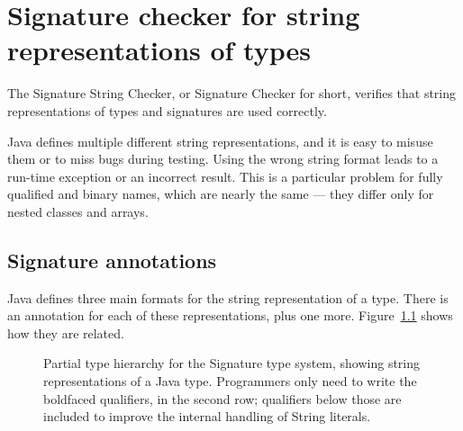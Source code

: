 \htmlhr
\chapter{Signature checker for string representations of types\label{signature-checker}}

The Signature String Checker, or Signature Checker for short, verifies that
string representations of types and signatures are used correctly.

Java defines multiple different string representations, and it is easy to
misuse them or to miss bugs during testing.  Using the wrong string format
leads to a run-time exception or an incorrect result.  This is a particular
problem for fully qualified and binary names, which are nearly the same ---
they differ only for nested classes and arrays.


\section{Signature annotations\label{signature-annotations}}

Java defines three main formats for the string representation of a type.
There is an annotation for each of these representations, plus one more.
Figure~\ref{fig:signature-hierarchy} shows how they are related.

\begin{figure}
\caption{Partial type hierarchy for the Signature type system, showing
  string representations of a Java type.  Programmers only need to write
  the boldfaced qualifiers, in the second row; qualifiers below those are
  included to improve the internal handling of String literals.}
\label{fig:signature-hierarchy}
\end{figure}


